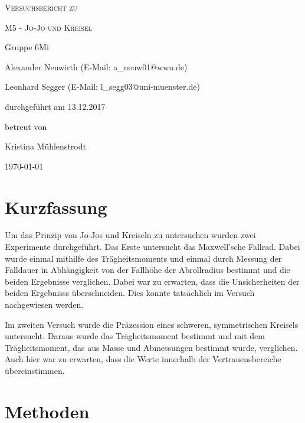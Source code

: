 \documentclass[
	a4paper,
	12pt,
	pagesize,
	ngerman
]{scrartcl}
\begin{document}
	
	\begin{titlepage}
		\centering
		{\scshape\LARGE Versuchsbericht zu \par}
		\vspace{1cm}
		{\scshape\huge M5 - Jo-Jo und Kreisel\par}
		\vspace{2.5cm}
		{\LARGE Gruppe 6Mi \par}
		\vspace{0.5cm}
		
		{\large Alexander Neuwirth (E-Mail: a\_neuw01@wwu.de) \par}
		{\large Leonhard Segger (E-Mail: l\_segg03@uni-muenster.de) \par}
		\vfill
		
		durchgeführt am 13.12.2017\par
		betreut von\par
		{\large Kristina Mühlenstrodt} %
		
		\vfill
		
		{\large \today\par}
	\end{titlepage}
	\tableofcontents
	\newpage

	\section{Kurzfassung}
	Um das Prinzip von Jo-Jos und Kreiseln zu untersuchen wurden zwei Experimente durchgeführt.
	Das Erste untersucht das Maxwell'sche Fallrad.
	Dabei wurde einmal mithilfe des Trägheitsmoments und einmal durch Messung der Falldauer in Abhängigkeit von der Fallhöhe der Abrollradius bestimmt und die beiden Ergebnisse verglichen.
	Dabei war zu erwarten, dass die Unsicherheiten der beiden Ergebnisss überschneiden.
	Dies konnte tatsächlich im Versuch nachgewiesen werden.
	\par
	Im zweiten Versuch wurde die Präzession eines schweren, symmetrischen Kreisels untersucht. 
	Daraus wurde das Trägheitsmoment bestimmt und mit dem Trägheitsmoment, das aus Masse und Abmessungen bestimmt wurde, verglichen.%
	Auch hier war zu erwarten, dass die Werte innerhalb der Vertrauensbereiche übereinstimmen.
	\section{Methoden}
\end{document}
